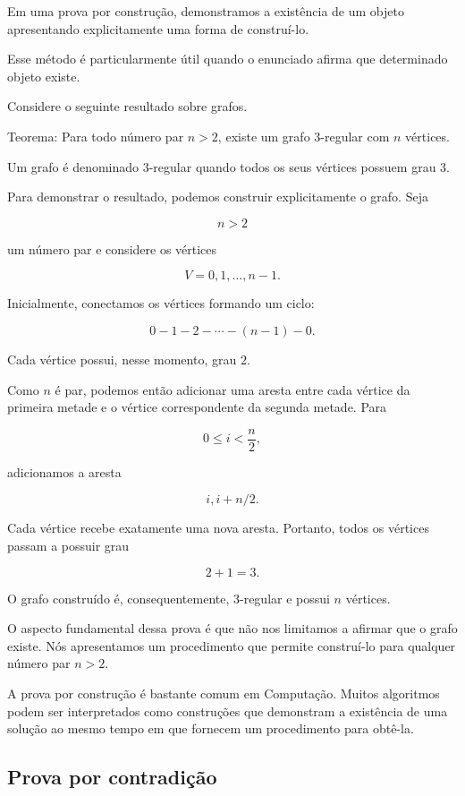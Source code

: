 \documentclass[
  brazilian,
  letterpaper,
]{book}
\theoremstyle{plain}
\theoremstyle{definition}
\theoremstyle{remark}
\begin{document}
Em uma prova por construção, demonstramos a existência de um objeto
apresentando explicitamente uma forma de construí-lo.

Esse método é particularmente útil quando o enunciado afirma que
determinado objeto existe.

Considere o seguinte resultado sobre grafos.

Teorema: Para todo número par \(n>2\), existe um grafo 3-regular com
\(n\) vértices.

Um grafo é denominado 3-regular quando todos os seus vértices possuem
grau \(3\).

Para demonstrar o resultado, podemos construir explicitamente o grafo.
Seja

\[
n>2
\]

um número par e considere os vértices

\[
V={0,1,\ldots,n-1}.
\]

Inicialmente, conectamos os vértices formando um ciclo:

\[
0-1-2-\cdots-(n-1)-0.
\]

Cada vértice possui, nesse momento, grau \(2\).

Como \(n\) é par, podemos então adicionar uma aresta entre cada vértice
da primeira metade e o vértice correspondente da segunda metade. Para

\[
0\leq i<\frac n2,
\]

adicionamos a aresta

\[
{i,i+n/2}.
\]

Cada vértice recebe exatamente uma nova aresta. Portanto, todos os
vértices passam a possuir grau

\[
2+1=3.
\]

O grafo construído é, consequentemente, 3-regular e possui \(n\)
vértices.

O aspecto fundamental dessa prova é que não nos limitamos a afirmar que
o grafo existe. Nós apresentamos um procedimento que permite construí-lo
para qualquer número par \(n>2\).

A prova por construção é bastante comum em Computação. Muitos algoritmos
podem ser interpretados como construções que demonstram a existência de
uma solução ao mesmo tempo em que fornecem um procedimento para obtê-la.

\subsection{Prova por contradição}\label{prova-por-contradiuxe7uxe3o}
\end{document}
